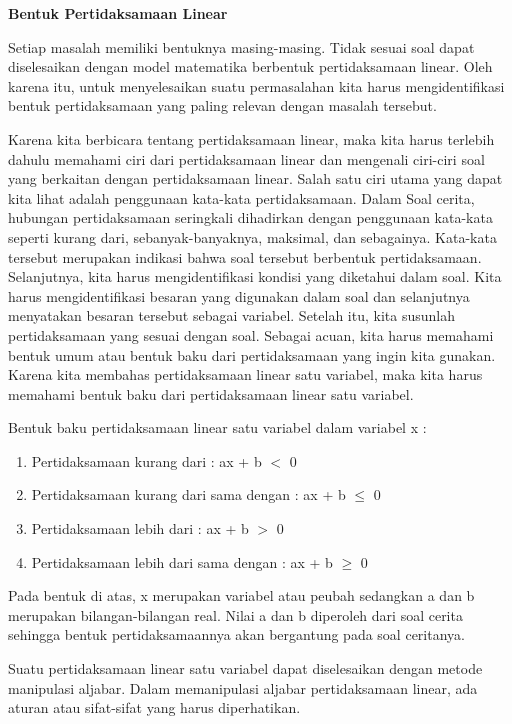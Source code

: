 \documentclass[11pt,fleqn]{book} %
\begin{document}
\noindent \textbf{Bentuk Pertidaksamaan Linear}

Setiap masalah memiliki bentuknya masing-masing. Tidak sesuai soal dapat diselesaikan dengan model matematika berbentuk pertidaksamaan linear. Oleh karena itu, untuk menyelesaikan suatu permasalahan kita harus mengidentifikasi bentuk pertidaksamaan yang paling relevan dengan masalah tersebut.

 Karena kita berbicara tentang pertidaksamaan linear, maka kita harus terlebih dahulu memahami ciri dari pertidaksamaan linear dan mengenali ciri-ciri soal yang berkaitan dengan pertidaksamaan linear. Salah satu ciri utama yang dapat kita lihat adalah penggunaan kata-kata pertidaksamaan. Dalam Soal cerita, hubungan pertidaksamaan seringkali dihadirkan dengan penggunaan kata-kata seperti kurang dari, sebanyak-banyaknya, maksimal, dan sebagainya. Kata-kata tersebut merupakan indikasi bahwa soal tersebut berbentuk pertidaksamaan. Selanjutnya, kita harus mengidentifikasi kondisi yang diketahui dalam soal. Kita harus mengidentifikasi besaran yang digunakan dalam soal dan selanjutnya menyatakan besaran tersebut sebagai variabel. Setelah itu, kita susunlah pertidaksamaan yang sesuai dengan soal. Sebagai acuan, kita harus memahami bentuk umum atau bentuk baku dari pertidaksamaan yang ingin kita gunakan. Karena kita membahas pertidaksamaan linear satu variabel, maka kita harus memahami bentuk baku dari pertidaksamaan linear satu variabel. 

\noindent Bentuk baku pertidaksamaan linear satu variabel dalam variabel x :

\begin{enumerate}
\item  Pertidaksamaan kurang dari : ax + b $<$ 0 

\item  Pertidaksamaan kurang dari sama dengan : ax + b $\mathrm{\le}$ 0

\item  Pertidaksamaan lebih dari : ax + b $>$ 0 

\item  Pertidaksamaan lebih dari sama dengan : ax + b $\ge $ 0
\end{enumerate}

\noindent Pada bentuk di atas, x merupakan variabel atau peubah sedangkan a dan b merupakan bilangan-bilangan real. Nilai a dan b diperoleh dari soal cerita sehingga bentuk pertidaksamaannya akan bergantung pada soal ceritanya.

\noindent Suatu pertidaksamaan linear satu variabel dapat diselesaikan dengan metode manipulasi aljabar. Dalam memanipulasi aljabar pertidaksamaan linear, ada aturan atau sifat-sifat yang harus diperhatikan. 
\end{document}
